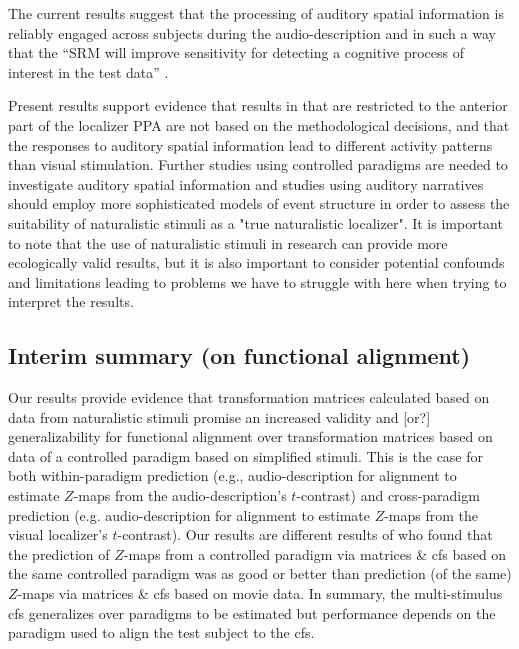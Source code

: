 %
The current results suggest that the processing of auditory spatial information
is reliably engaged across subjects during the audio-description and in such a
way that the ``SRM will improve sensitivity for detecting a cognitive process of
interest in the test data'' \citep{cohen2017computational}.

%
Present results support evidence that results in \citet{haeusler2022processing}
that are restricted to the anterior part of the localizer PPA are not based on
the methodological decisions, and that the responses to auditory spatial
information lead to different activity patterns than visual stimulation.
%
Further studies using controlled paradigms are needed to investigate auditory
spatial information and studies using auditory narratives should employ more
sophisticated models of event structure in order to assess the suitability of
naturalistic stimuli as a "true naturalistic localizer".
%
It is important to note that the use of naturalistic stimuli in research can
provide more ecologically valid results, but it is also important to consider
potential confounds and limitations leading to problems we have to struggle with
here when trying to interpret the results.




\subsection{Interim summary (on functional alignment)}



Our results provide evidence that transformation matrices calculated based on
data from naturalistic stimuli promise an increased validity and [or?]
generalizability for functional alignment over transformation matrices based on
data of a controlled paradigm based on simplified stimuli.
%
This is the case for both within-paradigm prediction (e.g., audio-description
for alignment to estimate $Z$-maps from the audio-description's $t$-contrast)
and cross-paradigm prediction (e.g. audio-description for alignment to estimate
$Z$-maps from the visual localizer's $t$-contrast).
%
Our results are different results of \citet{haxby2011common} who found that the
prediction of $Z$-maps from a controlled paradigm via matrices \& \ac{cfs} based
on the same controlled paradigm was as good or better than prediction (of the
same) $Z$-maps via matrices \& \ac{cfs} based on movie data.
%
In summary, the multi-stimulus \ac{cfs} generalizes over paradigms to be
estimated but performance depends on the paradigm used to align the test subject
to the \ac{cfs}.




